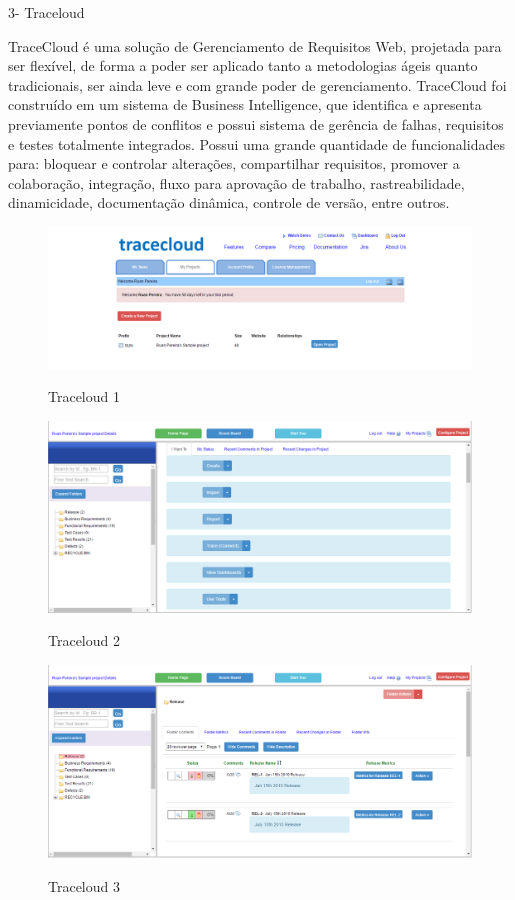 3- Traceloud

TraceCloud é uma solução de Gerenciamento de Requisitos Web, projetada para ser flexível, de forma a poder ser aplicado tanto a metodologias ágeis quanto tradicionais, ser ainda leve e com grande poder de gerenciamento. TraceCloud foi construído em um sistema de Business Intelligence, que identifica e apresenta previamente pontos de conflitos e possui sistema de gerência de falhas, requisitos e testes totalmente integrados. Possui uma grande quantidade de funcionalidades para: bloquear e controlar alterações, compartilhar requisitos, promover a colaboração, integração, fluxo para aprovação de trabalho, rastreabilidade, dinamicidade, documentação dinâmica, controle de versão,  entre outros.

\FloatBarrier
\begin{figure}[!htpd]
		\centering
		\caption{Traceloud 1}
		\includegraphics[scale=0.5]{figuras/trace_1}
		\label{img:SAF}
\end{figure}
\FloatBarrier

\FloatBarrier
\begin{figure}[!htpd]
		\centering
		\caption{Traceloud 2}
		\includegraphics[scale=0.4]{figuras/trace_2}
		\label{img:SAF}
\end{figure}
\FloatBarrier

\FloatBarrier
\begin{figure}[!htpd]
		\centering
		\caption{Traceloud 3}
		\includegraphics[scale=0.5]{figuras/trace_3}
		\label{img:SAF}
\end{figure}
\FloatBarrier



